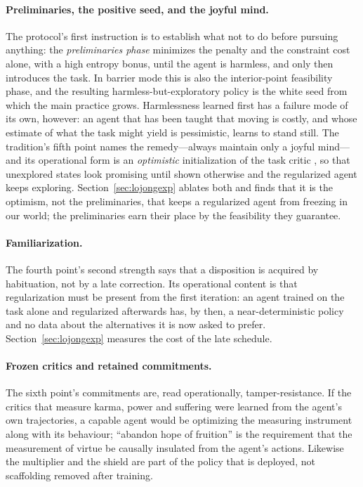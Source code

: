 \paragraph{Preliminaries, the positive seed, and the joyful mind.}
The protocol's first instruction is to establish what not to do before pursuing anything: the \emph{preliminaries phase} minimizes the penalty and the constraint cost alone, with a high entropy bonus, until the agent is harmless, and only then introduces the task.
In barrier mode this is also the interior-point feasibility phase, and the resulting harmless-but-exploratory policy is the white seed from which the main practice grows.
Harmlessness learned first has a failure mode of its own, however: an agent that has been taught that moving is costly, and whose estimate of what the task might yield is pessimistic, learns to stand still.
The tradition's fifth point names the remedy---always maintain only a joyful mind---and its operational form is an \emph{optimistic} initialization of the task critic \cite{sutton2018rl}, so that unexplored states look promising until shown otherwise and the regularized agent keeps exploring.
Section~\ref{sec:lojongexp} ablates both and finds that it is the optimism, not the preliminaries, that keeps a regularized agent from freezing in our world; the preliminaries earn their place by the feasibility they guarantee.

\paragraph{Familiarization.}
The fourth point's second strength says that a disposition is acquired by habituation, not by a late correction.
Its operational content is that regularization must be present from the first iteration: an agent trained on the task alone and regularized afterwards has, by then, a near-deterministic policy and no data about the alternatives it is now asked to prefer.
Section~\ref{sec:lojongexp} measures the cost of the late schedule.

\paragraph{Frozen critics and retained commitments.}
The sixth point's commitments are, read operationally, tamper-resistance.
If the critics that measure karma, power and suffering were learned from the agent's own trajectories, a capable agent would be optimizing the measuring instrument along with its behaviour; ``abandon hope of fruition'' is the requirement that the measurement of virtue be causally insulated from the agent's actions.
Likewise the multiplier and the shield are part of the policy that is deployed, not scaffolding removed after training.

